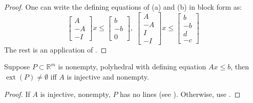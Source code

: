 \begin{proof}
	One can write the defining equations of (a) and (b) in block form as:
	\[
		\left[
			\begin{array}{r}
				A  \\\hline
				-A \\\hline
				-I
			\end{array}
			\right]
		x\leq
		\left[
			\begin{array}{r}
				b  \\\hline
				-b \\\hline
				0
			\end{array}
			\right],\;
		\left[
			\begin{array}{r}
				A  \\\hline
				-A \\\hline
				I  \\\hline
				-I
			\end{array}
			\right]
		x\leq
		\left[
			\begin{array}{r}
				b  \\\hline
				-b \\\hline
				d  \\\hline
				-c
			\end{array}
			\right]
	\]
	The rest is an application of .
\end{proof}

\begin{coro}\label{coro:017-extreme-existence-poly}
	Suppose $P\subset \mathbb{R}^m$ is nonempty, polyhedral with defining equation $Ax\leq b$, then $\operatorname{ext}(P)\neq\emptyset$ iff $A$ is injective and nonempty.
\end{coro}
\begin{proof}
	If $A$ is injective, nonempty, $P$ has no lines (see ). Otherwise, use .
\end{proof}

